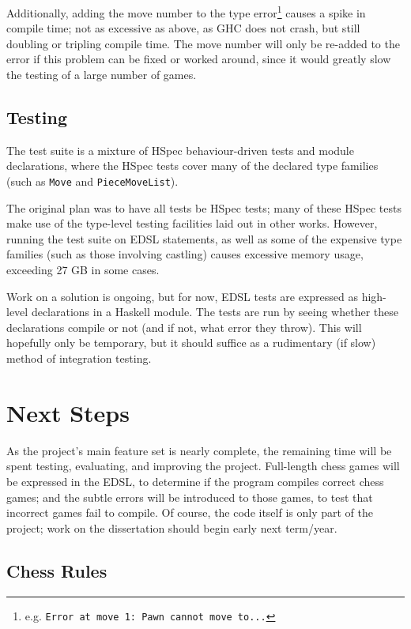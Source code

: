\documentclass[12pt, a4paper]{scrartcl}
\begin{document}
Additionally, adding the move number to the type error\footnote{e.g. \lstinline{Error at move 1: Pawn cannot move to...}} causes a spike in compile time; not as excessive as above, as GHC does not crash, but still doubling or tripling compile time. The move number will only be re-added to the error if this problem can be fixed or worked around, since it would greatly slow the testing of a large number of games.

\subsection{Testing}

The test suite is a mixture of HSpec behaviour-driven tests\cite{hspec} and module declarations, where the HSpec tests cover many of the declared type families (such as \lstinline{Move} and \lstinline{PieceMoveList}).

The original plan was to have all tests be HSpec tests; many of these HSpec tests make use of the type-level testing facilities laid out in other works\cite{mezzo}. However, running the test suite on EDSL statements, as well as some of the expensive type families (such as those involving castling) causes excessive memory usage, exceeding 27 GB in some cases.

Work on a solution is ongoing, but for now, EDSL tests are expressed as high-level declarations in a Haskell module. The tests are run by seeing whether these declarations compile or not (and if not, what error they throw). This will hopefully only be temporary, but it should suffice as a rudimentary (if slow) method of integration testing.

\section{Next Steps}

As the project's main feature set is nearly complete, the remaining time will be spent testing, evaluating, and improving the project. Full-length chess games will be expressed in the EDSL, to determine if the program compiles correct chess games; and the subtle errors will be introduced to those games, to test that incorrect games fail to compile. Of course, the code itself is only part of the project; work on the dissertation should begin early next term/year.

\subsection{Chess Rules}
\end{document}
